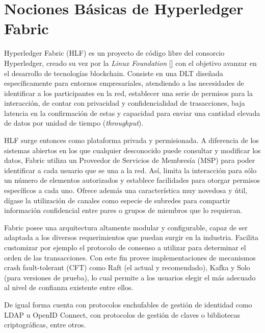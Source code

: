 
\section{Nociones B\'asicas de Hyperledger Fabric}

Hyperledger Fabric (HLF) es un proyecto de c\'odigo libre del consorcio Hyperledger, creado su vez por la \emph{Linux Foundation} [\cite{linuxfoundation}] con el objetivo avanzar en el desarrollo de tecnolog\'ias blockchain. Consiste en una DLT dise\~nada espec\'ificamente para entornos empresariales, atendiendo a las necesidades de identificar a los participantes en la red, establecer una serie de permisos para la interacci\'on, de contar con privacidad y confidencialidad de trasacciones, baja latencia en la confirmaci\'on de estas y capacidad para enviar una cantidad elevada de datos por unidad de tiempo (\emph{throughput}).

HLF surge entonces como plataforma privada y permisionada. A diferencia de los sistemas abiertos en los que cualquier desconocido puede consultar y modificar los datos, Fabric utiliza un Proveedor de Servicios de Membres\'ia (MSP) para poder identificar a cada usuario que se una a la red. As\'i, limita la interacci\'on para s\'olo un n\'umero de elementos autorizados y establece facilidades para otorgar permisos espec\'ificos a cada uno. Ofrece adem\'as una caracter\'istica muy novedosa y \'util, d\'igase la utilizaci\'on de canales como especie de subredes para compartir informaci\'on confidencial entre pares o grupos de miembros que lo requieran.

Fabric posee una arquitectura altamente modular y configurable, capaz de ser adaptada a los diversos requerimientos que puedan surgir en la industria. Facilita customizar por ejemplo el protocolo de consenso a utilizar para determinar el orden de las transacciones. Con este fin provee implementaciones de mecanismos crash fault-tolerant (CFT) como Raft (el actual y recomendado), Kafka y Solo (para versiones de prueba), lo cual permite a los usuarios elegir el m\'as adecuado al nivel de confianza existente entre ellos.

De igual forma cuenta con protocolos enchufables de gesti\'on de identidad como LDAP u OpenID Connect, con protocolos de gesti\'on de claves o bibliotecas criptogr\'aficas, entre otros.

